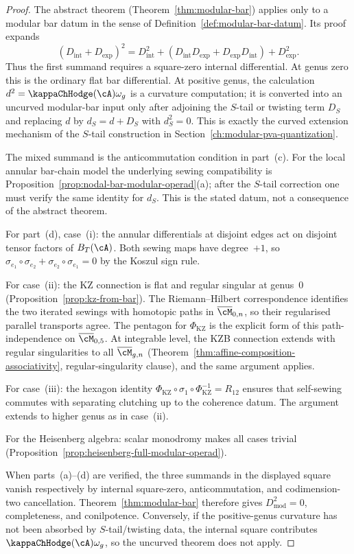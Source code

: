\begin{proof}
The abstract theorem
\textup{(}Theorem~\ref{thm:modular-bar}\textup{)} applies only to a
modular bar datum in the sense of
Definition~\ref{def:modular-bar-datum}.  Its proof expands
\[
 (D_{\mathrm{int}}+D_{\mathrm{exp}})^2
 =
 D_{\mathrm{int}}^2
 +(D_{\mathrm{int}}D_{\mathrm{exp}}
   +D_{\mathrm{exp}}D_{\mathrm{int}})
 +D_{\mathrm{exp}}^2 .
\]
Thus the first summand requires a square-zero internal differential.
At genus zero this is the ordinary flat bar differential.  At positive
genus, the calculation
\(d^2=\kappaChHodge(\cA)\omega_g\) is a curvature computation; it is
converted into an uncurved modular-bar input only after adjoining the
\(S\)-tail or twisting term \(D_S\) and replacing \(d\) by
\(d_S=d+D_S\) with \(d_S^2=0\).  This is exactly the curved extension
mechanism of the \(S\)-tail construction in
Section~\ref{ch:modular-pva-quantization}.

The mixed summand is the anticommutation condition in part~(c).
For the local annular bar-chain model the underlying sewing
compatibility is Proposition~\ref{prop:nodal-bar-modular-operad}(a);
after the \(S\)-tail correction one must verify the same identity for
\(d_S\).  This is the stated datum, not a consequence of the abstract
theorem.

For part~(d), case~(i): the annular differentials at
disjoint edges act on disjoint tensor factors of
$B_T(\cA)$. Both sewing maps have degree~$+1$, so
$\sigma_{e_1} \circ \sigma_{e_2}
+ \sigma_{e_2} \circ \sigma_{e_1} = 0$ by the
Koszul sign rule.

For case~(ii): the KZ connection is flat and regular
singular at genus~$0$
\textup{(}Proposition~\textup{\ref{prop:kz-from-bar}}\textup{)}.
The Riemann--Hilbert correspondence identifies the
two iterated sewings with homotopic paths in
$\overline{\cM}_{0,n}$, so their regularised
parallel transports agree. The pentagon for
$\Phi_{\mathrm{KZ}}$ is the explicit form of this
path-independence on $\overline{\cM}_{0,5}$.
At integrable level, the KZB connection extends with
regular singularities to all $\overline{\cM}_{g,n}$
\textup{(}Theorem~\textup{\ref{thm:affine-composition-associativity}},
regular-singularity clause\textup{)}, and the same argument applies.

For case~(iii): the hexagon identity
$\Phi_{\mathrm{KZ}} \circ \sigma_1 \circ
\Phi_{\mathrm{KZ}}^{-1} = R_{12}$
ensures that self-sewing commutes with separating
clutching up to the coherence datum. The argument
extends to higher genus as in case~(ii).

For the Heisenberg algebra: scalar monodromy makes
all cases trivial
\textup{(}Proposition~\textup{\ref{prop:heisenberg-full-modular-operad}}\textup{)}.

When parts~(a)--(d) are verified, the three summands in the displayed
square vanish respectively by internal square-zero, anticommutation,
and codimension-two cancellation.  Theorem~\ref{thm:modular-bar}
therefore gives \(D_{\mathrm{mod}}^2=0\), completeness, and
conilpotence.  Conversely, if the positive-genus curvature has not
been absorbed by \(S\)-tail/twisting data, the internal square
contributes \(\kappaChHodge(\cA)\omega_g\), so the uncurved theorem
does not apply.
\end{proof}

